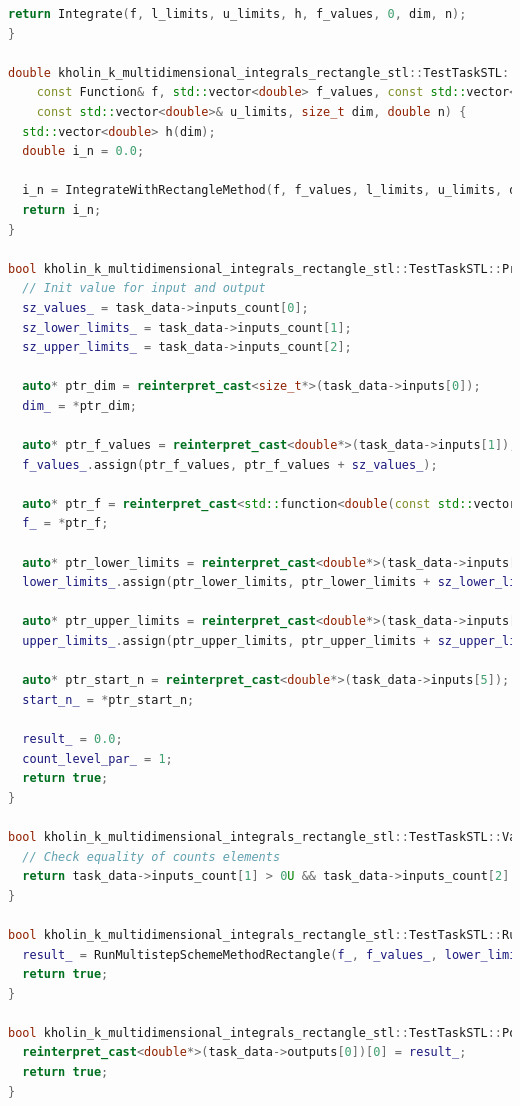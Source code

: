 \documentclass[14pt,a4paper]{article}
\begin{document}
\begin{framed}
\begin{lstlisting}[language=C++]
  return Integrate(f, l_limits, u_limits, h, f_values, 0, dim, n);
}

double kholin_k_multidimensional_integrals_rectangle_stl::TestTaskSTL::RunMultistepSchemeMethodRectangle(
    const Function& f, std::vector<double> f_values, const std::vector<double>& l_limits,
    const std::vector<double>& u_limits, size_t dim, double n) {
  std::vector<double> h(dim);
  double i_n = 0.0;

  i_n = IntegrateWithRectangleMethod(f, f_values, l_limits, u_limits, dim, n, h);
  return i_n;
}

bool kholin_k_multidimensional_integrals_rectangle_stl::TestTaskSTL::PreProcessingImpl() {
  // Init value for input and output
  sz_values_ = task_data->inputs_count[0];
  sz_lower_limits_ = task_data->inputs_count[1];
  sz_upper_limits_ = task_data->inputs_count[2];

  auto* ptr_dim = reinterpret_cast<size_t*>(task_data->inputs[0]);
  dim_ = *ptr_dim;

  auto* ptr_f_values = reinterpret_cast<double*>(task_data->inputs[1]);
  f_values_.assign(ptr_f_values, ptr_f_values + sz_values_);

  auto* ptr_f = reinterpret_cast<std::function<double(const std::vector<double>&)>*>(task_data->inputs[2]);
  f_ = *ptr_f;

  auto* ptr_lower_limits = reinterpret_cast<double*>(task_data->inputs[3]);
  lower_limits_.assign(ptr_lower_limits, ptr_lower_limits + sz_lower_limits_);

  auto* ptr_upper_limits = reinterpret_cast<double*>(task_data->inputs[4]);
  upper_limits_.assign(ptr_upper_limits, ptr_upper_limits + sz_upper_limits_);

  auto* ptr_start_n = reinterpret_cast<double*>(task_data->inputs[5]);
  start_n_ = *ptr_start_n;

  result_ = 0.0;
  count_level_par_ = 1;
  return true;
}

bool kholin_k_multidimensional_integrals_rectangle_stl::TestTaskSTL::ValidationImpl() {
  // Check equality of counts elements
  return task_data->inputs_count[1] > 0U && task_data->inputs_count[2] > 0U;
}

bool kholin_k_multidimensional_integrals_rectangle_stl::TestTaskSTL::RunImpl() {
  result_ = RunMultistepSchemeMethodRectangle(f_, f_values_, lower_limits_, upper_limits_, dim_, start_n_);
  return true;
}

bool kholin_k_multidimensional_integrals_rectangle_stl::TestTaskSTL::PostProcessingImpl() {
  reinterpret_cast<double*>(task_data->outputs[0])[0] = result_;
  return true;
}

\end{lstlisting}
\end{framed}
\end{document}
